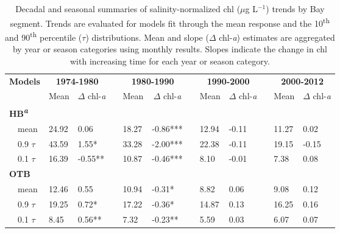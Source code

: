 \documentclass{svjour3}\usepackage[]{graphicx}\usepackage[]{color}
\newcommand{\mugl}{$\mu$g L$^{-1}$}
\begin{document}
\begin{table}[!tbp]
\caption{Decadal and seasonal summaries of salinity-normalized \ac{chl} (\mugl) trends by Bay segment. Trends are evaluated for models fit through the mean response and the 10\textsuperscript{th} and 90\textsuperscript{th} percentile ($\tau$) distributions.  Mean and slope ($\Delta$ chl-\textit{a}) estimates are aggregated by year or season categories using monthly results.  Slopes indicate the change in \ac{chl} with increasing time for each year or season category.\label{tab:trendsal}} 
\begin{center}
\begin{tabular}{lllcllcllcll}
\hline\hline
\multicolumn{1}{l}{\bfseries Models}&\multicolumn{2}{c}{\bfseries {\bf 1974-1980}}&\multicolumn{1}{c}{\bfseries }&\multicolumn{2}{c}{\bfseries {\bf 1980-1990}}&\multicolumn{1}{c}{\bfseries }&\multicolumn{2}{c}{\bfseries {\bf 1990-2000}}&\multicolumn{1}{c}{\bfseries }&\multicolumn{2}{c}{\bfseries {\bf 2000-2012}}\tabularnewline
\cline{2-3} \cline{5-6} \cline{8-9} \cline{11-12}
\multicolumn{1}{l}{}&\multicolumn{1}{c}{Mean}&\multicolumn{1}{c}{$\Delta$ chl-\textit{a}}&\multicolumn{1}{c}{}&\multicolumn{1}{c}{Mean}&\multicolumn{1}{c}{$\Delta$ chl-\textit{a}}&\multicolumn{1}{c}{}&\multicolumn{1}{c}{Mean}&\multicolumn{1}{c}{$\Delta$ chl-\textit{a}}&\multicolumn{1}{c}{}&\multicolumn{1}{c}{Mean}&\multicolumn{1}{c}{$\Delta$ chl-\textit{a}}\tabularnewline
\hline
{\bfseries HB\textsuperscript{\textit{a}}}&&&&&&&&&&&\tabularnewline
~~mean&24.92& 0.06 &&18.27&-0.86***&&12.94&-0.11 &&11.27& 0.02 \tabularnewline
~~0.9 $\tau$&43.59& 1.55*&&33.28&-2.00***&&22.38&-0.11 &&19.15&-0.15 \tabularnewline
~~0.1 $\tau$&16.39&-0.55**&&10.87&-0.46***&& 8.10&-0.01 && 7.38& 0.08 \tabularnewline
\hline
{\bfseries OTB}&&&&&&&&&&&\tabularnewline
~~mean&12.46& 0.55 &&10.94&-0.31*&& 8.82& 0.06 && 9.08& 0.12 \tabularnewline
~~0.9 $\tau$&19.25& 0.72*&&17.22&-0.36*&&14.87& 0.13 &&16.25& 0.16 \tabularnewline
~~0.1 $\tau$& 8.45& 0.56**&& 7.32&-0.23**&& 5.59& 0.03 && 6.07& 0.07 \tabularnewline

\end{tabular}
\end{center}
\end{table}
\end{document}
